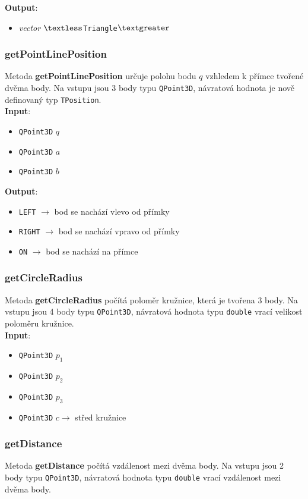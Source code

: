 \documentclass[a4paper, 12pt]{article}
\begin{document}
\textbf{Output}:
\begin{itemize}
\item \textsl{vector} $\textless$\texttt{Triangle}$\textgreater$
\end{itemize}

\subsubsection*{getPointLinePosition}
Metoda \textbf{getPointLinePosition} určuje polohu bodu $q$ vzhledem k přímce tvořené dvěma body. Na vstupu jsou 3 body typu \texttt{QPoint3D}, návratová hodnota je nově definovaný typ \texttt{TPosition}.\\

\textbf{Input}:
\begin{itemize}
\item \texttt{QPoint3D} $q$
\item \texttt{QPoint3D} $a$
\item \texttt{QPoint3D} $b$
\end{itemize}

\textbf{Output}:
\begin{itemize}
\item \texttt{LEFT} $\rightarrow$ bod se nachází vlevo od přímky
\item \texttt{RIGHT} $\rightarrow$ bod se nachází vpravo od přímky
\item \texttt{ON} $\rightarrow$ bod se nachází na přímce
\end{itemize}

\subsubsection*{getCircleRadius}
Metoda \textbf{getCircleRadius} počítá poloměr kružnice, která je tvořena 3 body. Na vstupu jsou 4 body typu \texttt{QPoint3D}, návratová hodnota typu \texttt{double} vrací velikost poloměru kružnice.\\ 

\textbf{Input}:
\begin{itemize}
\item \texttt{QPoint3D} $p_1$ 
\item \texttt{QPoint3D} $p_2$ 
\item \texttt{QPoint3D} $p_3$
\item \texttt{QPoint3D} $c \rightarrow$ střed kružnice
\end{itemize}

\subsubsection*{getDistance}
Metoda \textbf{getDistance} počítá vzdálenost mezi dvěma body. Na vstupu jsou 2 body typu \texttt{QPoint3D}, návratová hodnota typu \texttt{double} vrací vzdálenost mezi dvěma body.\\ 
\end{document}
